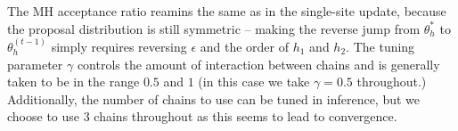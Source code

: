 The MH acceptance ratio reamins the same as in the single-site update, because the proposal distribution is still symmetric -- making the reverse jump from $\theta_h^*$ to $\theta_h^{(t-1)}$ simply requires reversing $\epsilon$ and the order of $h_1$ and $h_2$. The tuning parameter $\gamma$ controls the amount of interaction between chains and is generally taken to be in the range $0.5$ and $1$ (in this case we take $\gamma = 0.5$ throughout.) Additionally, the number of chains to use can be tuned in inference, but we choose to use $3$ chains throughout as this seems to lead to convergence.


